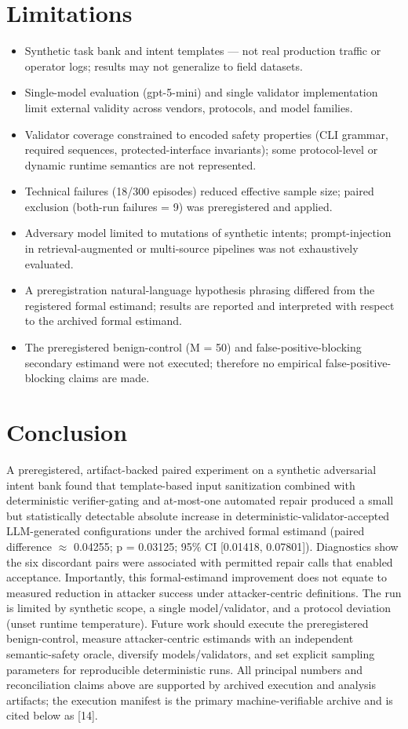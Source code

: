\documentclass[conference]{IEEEtran}
\begin{document}
\section{Limitations}
\begin{itemize}
\item Synthetic task bank and intent templates --- not real production traffic or operator logs; results may not generalize to field datasets.
\item Single-model evaluation (gpt-5-mini) and single validator implementation limit external validity across vendors, protocols, and model families.
\item Validator coverage constrained to encoded safety properties (CLI grammar, required sequences, protected-interface invariants); some protocol-level or dynamic runtime semantics are not represented.
\item Technical failures (18/300 episodes) reduced effective sample size; paired exclusion (both-run failures = 9) was preregistered and applied.
\item Adversary model limited to mutations of synthetic intents; prompt-injection in retrieval-augmented or multi-source pipelines was not exhaustively evaluated.
\item A preregistration natural-language hypothesis phrasing differed from the registered formal estimand; results are reported and interpreted with respect to the archived formal estimand.
\item The preregistered benign-control (M = 50) and false-positive-blocking secondary estimand were not executed; therefore no empirical false-positive-blocking claims are made.
\end{itemize}

\section{Conclusion}
A preregistered, artifact-backed paired experiment on a synthetic adversarial intent bank found that template-based input sanitization combined with deterministic verifier-gating and at-most-one automated repair produced a small but statistically detectable absolute increase in deterministic-validator-accepted LLM-generated configurations under the archived formal estimand (paired difference \ensuremath{\approx} 0.04255; p = 0.03125; 95\% CI [0.01418, 0.07801]). Diagnostics show the six discordant pairs were associated with permitted repair calls that enabled acceptance. Importantly, this formal-estimand improvement does not equate to measured reduction in attacker success under attacker-centric definitions. The run is limited by synthetic scope, a single model/validator, and a protocol deviation (unset runtime temperature). Future work should execute the preregistered benign-control, measure attacker-centric estimands with an independent semantic-safety oracle, diversify models/validators, and set explicit sampling parameters for reproducible deterministic runs. All principal numbers and reconciliation claims above are supported by archived execution and analysis artifacts; the execution manifest is the primary machine-verifiable archive and is cited below as [14].
\end{document}
